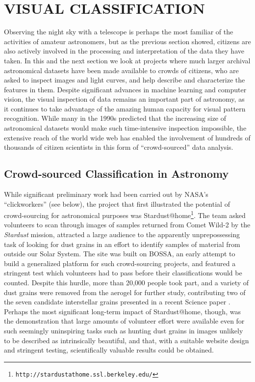 \documentclass{ar2e}
\def\CaseStudy#1{\noindent{\it\bf #1 \,\,\,\,}}
\def\url#1{\texttt{#1}}
\begin{document}

\section{VISUAL CLASSIFICATION}
\label{sec:class}

Observing the night sky with a telescope is perhaps the most familiar of the
activities of amateur astronomers, but as the previous section showed, citizens
are also actively involved in the processing and interpretation of the data they
have taken.  In this and the next section we look at projects where much larger
archival astronomical datasets have been made available to crowds of citizens,
who are asked to inspect images and light curves, and help describe and
characterize the features in them. Despite significant advances in machine
learning and computer vision, the visual inspection of data remains an important
part of astronomy, as it continues to take advantage of the amazing human
capacity for visual pattern recognition. While many in the 1990s predicted that
the increasing size of astronomical datasets would make such time-intensive
inspection impossible, the extensive reach of the world wide web has enabled the
involvement of hundreds of thousands of citizen scientists in this form of
``crowd-sourced'' data analysis. 


\subsection{Crowd-sourced Classification in Astronomy}
\label{sec:class:astro}

\CaseStudy{Stardust@home}
While significant preliminary work had been carried out by NASA's
``clickworkers'' (see below), the project that first illustrated the potential
of crowd-sourcing for astronomical purposes was 
Stardust@home\footnote{\url{http://stardustathome.ssl.berkeley.edu/}}. The team
asked volunteers to scan through images of samples returned from Comet Wild-2 by
the \textit{Stardust} mission, attracted a large audience to the apparently
unprepossessing task of looking for dust grains in an effort to identify samples
of material from outside our Solar System. The site was built on BOSSA, an early
attempt to build a generalized platform for such crowd-sourcing projects, and
featured a stringent test which volunteers had to pass before their
classifications would be counted. Despite this hurdle, more than 20,000 people
took part, and a variety of dust grains were removed from the aerogel for
further study, contributing two of the seven candidate interstellar grains
presented in a recent Science paper \citep{Westphal}. Perhaps the most
significant long-term impact of Stardust@home, though, was the demonstration
that large amounts of volunteer effort were available even for such seemingly
uninspiring tasks such as hunting dust grains in images unlikely to be described
as intrinsically beautiful, and that, with a suitable website design and
stringent testing, scientifically valuable results could be obtained. 
\end{document}
